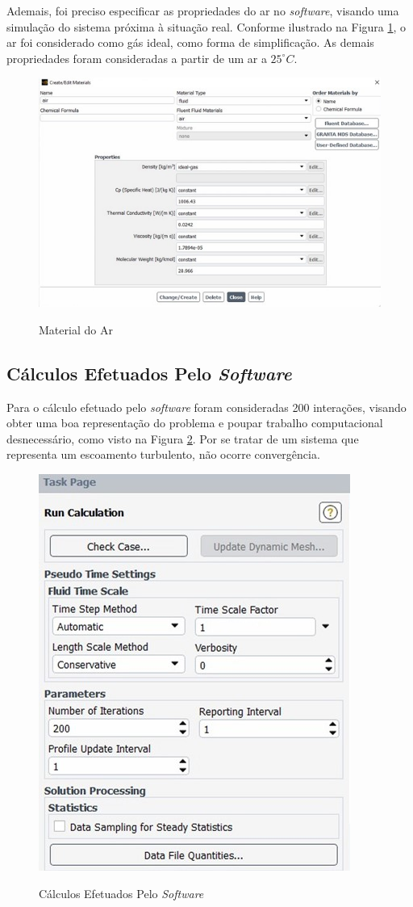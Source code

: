 \documentclass[acronym,symbols,table]{fei}
\begin{document}
Ademais, foi preciso especificar as propriedades do ar no \textit{software}, visando uma simulação do sistema próxima à situação real. Conforme ilustrado na Figura \ref{fig:Material_Ar}, o ar foi considerado como gás ideal, como forma de simplificação. As demais propriedades foram consideradas a partir de um ar a $25^\circ C$.

\begin{figure}[!htb]
    \centering
    \caption{Material do Ar}
    \includegraphics[width=0.8\linewidth]{Imagens/Material_Ar.jpg}
    \label{fig:Material_Ar}
\end{figure}


\subsection{Cálculos Efetuados Pelo \textit{Software}}

Para o cálculo efetuado pelo \textit{software} foram consideradas 200 interações, visando obter uma boa representação do problema e poupar trabalho computacional desnecessário, como visto na Figura \ref{fig:calculation}. Por se tratar de um sistema que representa um escoamento turbulento, não ocorre convergência.

\begin{figure}[!htb]
    \centering
    \caption{Cálculos Efetuados Pelo \textit{Software}}
    \includegraphics[width=0.5\linewidth]{Imagens/calculation.jpg}
    \label{fig:calculation}
\end{figure}
\end{document}
